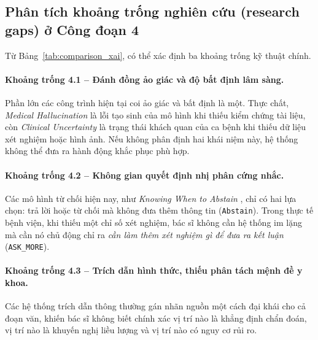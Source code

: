 \subsection{Phân tích khoảng trống nghiên cứu (research gaps) ở Công đoạn 4}
Từ Bảng~\ref{tab:comparison_xai}, có thể xác định ba khoảng trống kỹ thuật chính.

\paragraph{Khoảng trống 4.1 -- Đánh đồng ảo giác và độ bất định lâm sàng.}
Phần lớn các công trình hiện tại coi ảo giác và bất định là một. Thực chất, \emph{Medical Hallucination} là lỗi tạo sinh của mô hình khi thiếu kiểm chứng tài liệu, còn \emph{Clinical Uncertainty} là trạng thái khách quan của ca bệnh khi thiếu dữ liệu xét nghiệm hoặc hình ảnh. Nếu không phân định hai khái niệm này, hệ thống không thể đưa ra hành động khắc phục phù hợp.

\paragraph{Khoảng trống 4.2 -- Không gian quyết định nhị phân cứng nhắc.}
Các mô hình từ chối hiện nay, như \emph{Knowing When to Abstain} \cite{knowing_when_abstain_2026}, chỉ có hai lựa chọn: trả lời hoặc từ chối mà không đưa thêm thông tin (\texttt{Abstain}). Trong thực tế bệnh viện, khi thiếu một chỉ số xét nghiệm, bác sĩ không cần hệ thống im lặng mà cần nó chủ động chỉ ra \emph{cần làm thêm xét nghiệm gì để đưa ra kết luận} (\texttt{ASK\_MORE}).

\paragraph{Khoảng trống 4.3 -- Trích dẫn hình thức, thiếu phân tách mệnh đề y khoa.}
Các hệ thống trích dẫn thông thường gán nhãn nguồn một cách đại khái cho cả đoạn văn, khiến bác sĩ không biết chính xác vị trí nào là khẳng định chẩn đoán, vị trí nào là khuyến nghị liều lượng và vị trí nào có nguy cơ rủi ro.
